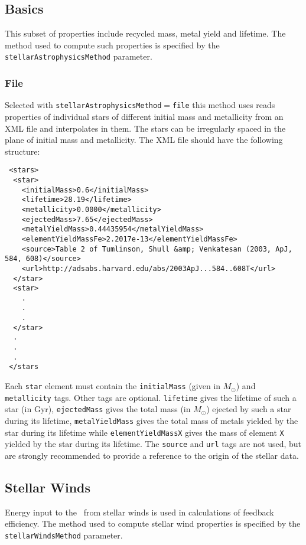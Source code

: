 \subsection{Basics}

This subset of properties include recycled mass, metal yield and lifetime.  The method used to compute such properties is specified by the {\tt stellarAstrophysicsMethod} parameter.

\subsubsection{File}\label{sec:StellarAstrophysicsFile}

Selected with {\tt stellarAstrophysicsMethod}$=${\tt file} this method uses reads properties of individual stars of different initial mass and metallicity from an XML file and interpolates in them. The stars can be irregularly spaced in the plane of initial mass and metallicity. The XML file should have the following structure:
\begin{verbatim}
 <stars>
  <star>
    <initialMass>0.6</initialMass>
    <lifetime>28.19</lifetime>
    <metallicity>0.0000</metallicity>
    <ejectedMass>7.65</ejectedMass>
    <metalYieldMass>0.44435954</metalYieldMass>
    <elementYieldMassFe>2.2017e-13</elementYieldMassFe>
    <source>Table 2 of Tumlinson, Shull &amp; Venkatesan (2003, ApJ, 584, 608)</source>
    <url>http://adsabs.harvard.edu/abs/2003ApJ...584..608T</url>
  </star>
  <star>
    .
    .
    .
  </star>
  .
  .
  .
 </stars
\end{verbatim}
Each {\tt star} element must contain the {\tt initialMass} (given in $M_\odot$) and {\tt metallicity} tags. Other tags are optional. {\tt lifetime} gives the lifetime of such a star (in Gyr), {\tt ejectedMass} gives the total mass (in $M_\odot$) ejected by such a star during its lifetime, {\tt metalYieldMass} gives the total mass of metals yielded by the star during its lifetime while {\tt elementYieldMassX} gives the mass of element {\tt X} yielded by the star during its lifetime. The {\tt source} and {\tt url} tags are not used, but are strongly recommended to provide a reference to the origin of the stellar data.

\subsection{Stellar Winds}

Energy input to the \ISM\ from stellar winds is used in calculations of feedback efficiency. The method used to compute stellar wind properties is specified by the {\tt stellarWindsMethod} parameter.

